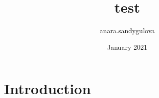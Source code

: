 \documentclass{article}
\title{test}
\author{anara.sandygulova }
\date{January 2021}
\begin{document}
\maketitle

\section{Introduction}
\end{document}
